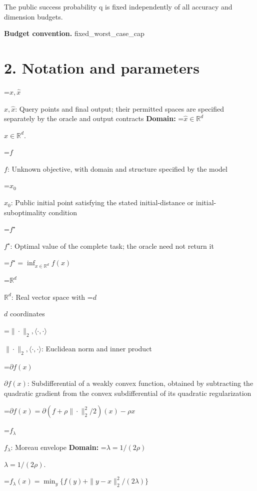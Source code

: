 \documentclass[10pt,a4paper]{article}
\newcommand{\AtlasMath}[1]{\par\begingroup\centering\setbox0=\hbox{$\displaystyle #1$}\ifdim\wd0>1.4\linewidth\typeout{ATLAS WIDE FORMULA: \the\wd0}\fi\ifdim\wd0>\linewidth\resizebox{\linewidth}{!}{\box0}\else\box0\fi\par\endgroup}
\newcommand{\AtlasInlineMath}[1]{\begingroup\setbox0=\hbox{$#1$}\ifdim\wd0>.4\linewidth\endgroup\AtlasMath{#1}\else\endgroup$#1$\fi}
\begin{document}
The public success probability q is fixed independently of all accuracy and dimension budgets.



\textbf{Budget convention.} fixed\_worst\_case\_cap



\section{2. Notation and parameters}


\AtlasInlineMath{x,\widehat{x}}: Query points and final output; their permitted spaces are specified separately by the oracle and output contracts \textbf{Domain:} \AtlasInlineMath{\widehat{x}\in \mathbb{R}^d}.



\AtlasInlineMath{f}: Unknown objective, with domain and structure specified by the model



\AtlasInlineMath{x_0}: Public initial point satisfying the stated initial-distance or initial-suboptimality condition



\AtlasInlineMath{f^\star}: Optimal value of the complete task; the oracle need not return it




\AtlasMath{f^\star=\inf_{x\in \mathbb{R}^d}f(x)}




\AtlasInlineMath{\mathbb{R}^d}: Real vector space with \AtlasInlineMath{d} coordinates



\AtlasInlineMath{\|\cdot\|_2,\langle\cdot,\cdot\rangle}: Euclidean norm and inner product



\AtlasInlineMath{\partial f(x)}: Subdifferential of a weakly convex function, obtained by subtracting the quadratic gradient from the convex subdifferential of its quadratic regularization




\AtlasMath{\partial f(x)=\partial(f+\rho\|\cdot\|_2^2/2)(x)-\rho x}




\AtlasInlineMath{f_\lambda}: Moreau envelope \textbf{Domain:} \AtlasInlineMath{\lambda=1/(2\rho)}.




\AtlasMath{f_\lambda(x)=\min_y\{f(y)+\|y-x\|_2^2/(2\lambda)\}}
\end{document}
